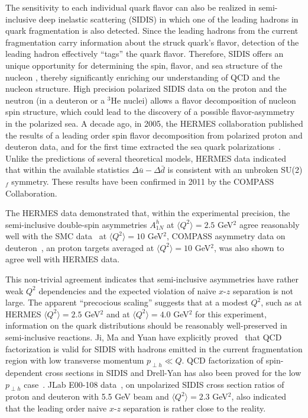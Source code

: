 The sensitivity to each individual quark flavor can also be realized
in semi-inclusive deep inelastic scattering (SIDIS)
in which one of the leading hadrons in quark fragmentation is also detected.
Since the leading hadrons from the current fragmentation 
carry information about
the struck quark's flavor, detection of the leading hadron 
effectively ``tags'' the quark flavor.
Therefore, SIDIS offers an unique opportunity 
for determining the spin, flavor, and sea structure of the nucleon \cite{Frankfurt}, 
thereby significantly enriching 
our understanding of QCD and the nucleon structure. 
High precision polarized SIDIS data on the proton and the neutron 
(in a deuteron or a $^3$He nuclei) allows
a flavor decomposition of nucleon spin structure, which could lead to
the discovery of a possible flavor-asymmetry in the polarized sea.
A decade ago, in 2005, the HERMES collaboration
published the results of a leading order spin flavor decomposition from polarized 
proton and deuteron data, and for the first time
extracted the sea quark 
polarizations~\cite{hermes2002,hermesthesis}. Unlike 
the predictions of several theoretical models,
HERMES data indicated that within the available statistics
$\Delta \bar{u}- \Delta \bar{d}$ is consistent
with an unbroken SU(2)$_f$ symmetry.  These results have been confirmed in 2011 by the COMPASS Collaboration. 

The HERMES data demonstrated that, within the experimental precision, 
the semi-inclusive double-spin asymmetries $A_{1N}^h$ 
at $\langle Q^2 \rangle=2.5$ GeV$^2$ 
agree reasonably well with the 
SMC data~\cite{smc1998} at $\langle Q^2 \rangle=10$ GeV$^2$, COMPASS 
asymmetry data on deuteron~\cite{compass2007}, an proton targets  %
averaged at $\langle Q^2 \rangle=10$ GeV$^2$, was also shown to
agree well with HERMES data.

This non-trivial agreement indicates that semi-inclusive asymmetries have rather weak $Q^2$ dependencies and 
the expected violation of naive \lo $x$-$z$ separation is not large.  
The apparent ``precocious scaling'' suggests that at a modest $Q^2$, such as at HERMES $\langle Q^2 \rangle=2.5$ GeV$^2$ and 
at $\langle Q^2 \rangle=4.0$ GeV$^2$ for this experiment, information on the  quark distributions should be reasonably  
well-preserved in semi-inclusive reactions.   Ji, Ma and Yuan have  
explicitly proved~\cite{jimayuan04} that QCD factorization is valid for SIDIS with 
hadrons emitted in the current fragmentation region with low  
transverse momentum $p_{\perp h } \ll Q$.  QCD factorization of spin-dependent
cross sections in SIDIS and Drell-Yan has also been proved
 for the low $p_{\perp h }$ case~\cite{jimayuan04_2}.
JLab E00-108 data~\cite{rolf}, on unpolarized SIDIS cross section ratios
of proton and deuteron with 5.5 GeV beam and $\langle Q^2 \rangle=2.3$ GeV$^2$,  
also indicated that the leading order naive $x$-$z$ separation is
rather close to the reality. 

